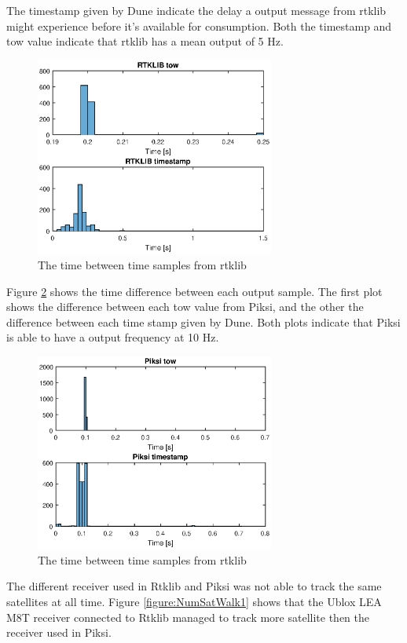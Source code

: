 The timestamp given by Dune indicate the delay a output message from rtklib might experience before it's available for consumption. Both the timestamp and \gls{tow} value indicate that rtklib has a mean output of 5 Hz. 
\begin{figure}[H]
	\centering
		\includegraphics[width=0.7\textwidth]{figs/plots/rtktime.eps}
		\caption{The time between time samples from rtklib}
		\label{figure:timeRTKwalk1}
\end{figure}
Figure \ref{figure:timePiksiWalk1} shows the time difference between each output sample. The first plot shows the difference between each \gls{tow} value from Piksi, and the other the difference between each time stamp given by Dune. Both plots indicate that Piksi is able to have a output frequency at 10 Hz.
\begin{figure}[H]
	\centering
		\includegraphics[width=0.7\textwidth]{figs/plots/piksitime.eps}
		\caption{The time between time samples from rtklib}
		\label{figure:timePiksiWalk1}
\end{figure}
The different receiver used in Rtklib and Piksi was not able to track the same satellites at all time. Figure \ref{figure:NumSatWalk1} shows that the Ublox LEA M8T receiver connected to Rtklib managed to track more satellite then the receiver used in Piksi.
